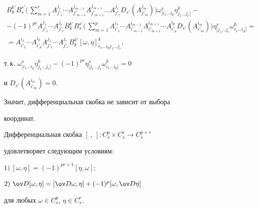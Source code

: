 \begin{pf}
\begin{multline*}
B_k^{k'}B_s^{s'}\bigg(\,\sum_{m=1}^{r}A_{j'_{1}}^{j_{1}} \dotsb


A_{j'_{m-1}}^{j_{m-1}} A_{j'_{m+1}}^{j_{m+1}} \dotsc


A_{j'_{r}}^{j_{r}} D_{s'}(A^{j_{m}}_{j'_{m}})\bigg)


\omega^{s}_{[i_{1} \dotsc i_{p}}


\eta^{k}_{j_{1} \dotsc j_{r}]} - \\


%


- (-1)^{pr} A_{j'_{1}}^{j_{1}} \dotsb A_{j'_{r}}^{j_{r}}


B_k^{k'}B_s^{s'}\bigg(\,\sum_{m=1}^{p}A_{i'_{1}}^{i_{1}} \dotsb


A_{i'_{m-1}}^{i_{m-1}} A_{i'_{m+1}}^{i_{m+1}} \dotsb


A_{i'_{p}}^{i_{p}} D_{s'}(A^{i_{m}}_{i'_{m}})\bigg)


\eta^{s}_{[j_{1} \dotsc j_{r}} \omega^{k}_{i_{1} \dotsc i_{p}]}=\\


%


= A_{i'_{1}}^{i_{1}} \dotsb A_{i'_{p}}^{i_{p}}


A_{j'_{1}}^{j_{1}} \dotsb


A_{j'_{r}}^{j_{r}}B_k^{k'} [\omega,


\eta]_{i_{1} \dotsc i_{p} j_{1}\dotsc j_{r}}^{k},


\end{multline*}


т.\,к. $\omega^{s}_{[i_{1} \dotsc i_{p}}


\eta^{k}_{j_{1} \dotsc j_{r}]} - (-1)^{pr} \eta^{s}_{[j_{1}


\dotsc j_{r}} \omega^{k}_{i_{1} \dotsc i_{p}]}=0$


и $D_{s'} (A_{i'_{m}}^{i_{m}})=0$.





Значит, дифференциальная скобка не зависит от выбора


координат.


\end{pf}





\begin{assrt}


Дифференциальная скобка $[\ ,\ ] : C^p_s \times C^r_s \to C^{p+r}_s$


удовлетворяет следующим условиям:





$1)\ [\omega, \eta]=(-1)^{pr+1} [\eta,\omega];$





$2)\ \ov D[\omega,\eta]=[\ov D \omega,\eta] + (-1)^{p}


[\omega, \ov D \eta]$


для любых $\omega \in C^p_s$, $\eta \in C^r_s$.


\end{assrt}





